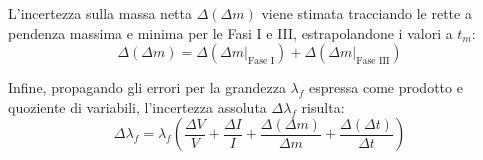 \documentclass[a4paper,12pt]{article}
\begin{document}
L'incertezza sulla massa netta $\Delta(\Delta m)$ viene stimata tracciando le rette a pendenza massima e minima per le Fasi I e III, estrapolandone i valori a $t_m$:
\begin{equation*}
\Delta(\Delta m) = \Delta(\Delta m|_{\text{Fase I}}) + \Delta(\Delta m|_{\text{Fase III}})
\end{equation*}

Infine, propagando gli errori per la grandezza $\lambda_f$ espressa come prodotto e quoziente di variabili, l'incertezza assoluta $\Delta \lambda_f$ risulta:
\begin{equation*}
\Delta \lambda_f = \lambda_f \left( \frac{\Delta V}{V} + \frac{\Delta I}{I} + \frac{\Delta(\Delta m)}{\Delta m} + \frac{\Delta(\Delta t)}{\Delta t} \right)
\end{equation*}
\end{document}
